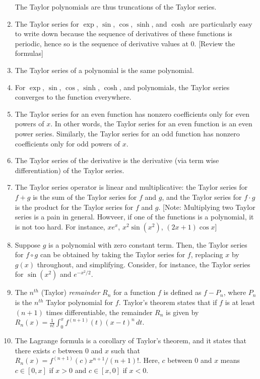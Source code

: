 \documentclass[10pt]{amsart}
\begin{document}
\begin{enumerate}
  The Taylor polynomials are thus truncations of the Taylor series.
\item The Taylor series for $\exp$, $\sin$, $\cos$, $\sinh$, and
  $\cosh$ are particularly easy to write down because the sequence of
  derivatives of these functions is periodic, hence so is the sequence
  of derivative values at $0$. [Review the formulas]
\item The Taylor series of a polynomial is the same polynomial.
\item For $\exp$, $\sin$, $\cos$, $\sinh$, $\cosh$, and polynomials,
  the Taylor series converges to the function everywhere.
\item The Taylor series for an even function has nonzero coefficients
  only for even powers of $x$. In other words, the Taylor series for
  an even function is an even power series. Similarly, the Taylor
  series for an odd function has nonzero coefficients only for odd
  powers of $x$.
\item The Taylor series of the derivative is the derivative (via term
  wise differentiation) of the Taylor series.
\item The Taylor series operator is linear and multiplicative: the
  Taylor series for $f + g$ is the sum of the Taylor series for $f$
  and $g$, and the Taylor series for $f \cdot g$ is the product for
  the Taylor series for $f$ and $g$. [Note: Multiplying two Taylor
  series is a pain in general. Howveer, if one of the functions is a
  polynomial, it is not too hard. For instance, $xe^x$, $x^2 \sin
  (x^2)$, $(2x + 1)\cos x$]
\item Suppose $g$ is a polynomial with zero constant term. Then, the
  Taylor series for $f \circ g$ can be obtained by taking the Taylor
  series for $f$, replacing $x$ by $g(x)$ throughout, and
  simplifying. Consider, for instance, the Taylor series for
  $\sin(x^2)$ and $e^{-x^2/2}$.
\item The $n^{th}$ (Taylor) {\em remainder} $R_n$ for a function $f$
  is defined as $f - P_n$, where $P_n$ is the $n^{th}$ Taylor
  polynomial for $f$. Taylor's theorem states that if $f$ is at least
  $(n + 1)$ times differentiable, the remainder $R_n$ is given by
  $R_n(x) = \frac{1}{n!} \int_0^x f^{(n +1)}(t) (x - t)^n \, dt$.
\item The Lagrange formula is a corollary of Taylor's theorem, and it
  states that there exists $c$ between $0$ and $x$ such that $R_n(x) =
  f^{(n + 1)}(c)x^{n+1}/(n + 1)!$. Here, $c$ between $0$ and $x$ means
  $c \in [0,x]$ if $x > 0$ and $c \in [x,0]$ if $x < 0$.

\end{enumerate}
\end{document}
